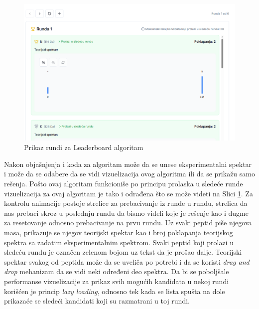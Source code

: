 \documentclass[12pt,oneside]{memoir}
\begin{document}
\begin{figure}[h]
\centering
\includegraphics[width=1\textwidth,height=0.4\textheight]{images/leaderboard_2.png}
\caption{Prikaz rundi za Leaderboard algoritam}
\label{fig:leaderboard_2}
\end{figure}

Nakon objašnjenja i koda za algoritam može da se unese eksperimentalni spektar i može da se odabere da se vidi vizuelizacija ovog algoritma ili da se prikažu samo rešenja. Pošto ovaj algoritam funkcioniše po principu prolaska u sledeće runde vizuelizacija za ovaj algoritam je tako i odrađena što se može videti na Slici \ref{fig:leaderboard_2}. Za kontrolu animacije postoje strelice za prebacivanje iz runde u rundu, strelica da nas prebaci skroz u poslednju rundu da bismo videli koje je rešenje kao i dugme za resetovanje odnosno prebacivanje na prvu rundu. Uz svaki peptid piše njegova masa, prikazuje se njegov teorijski spektar kao i broj poklapanja teorijskog spektra sa zadatim eksperimentalnim spektrom. Svaki peptid koji prolazi u sledeću rundu je označen zelenom bojom uz tekst da je prošao dalje.
Teorijski spektar svakog od peptida može da se uveliča po potrebi i da se koristi \emph{drag and drop} mehanizam da se vidi neki određeni deo spektra.
Da bi se poboljšale performanse vizuelizacije za prikaz svih mogućih kandidata u nekoj rundi korišćen je princip \emph{lazy loading}, odnosno tek kada se lista spušta na dole prikazaće se sledeći kandidati koji su razmatrani u toj rundi.
\end{document}
